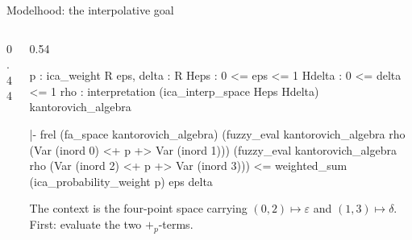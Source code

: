 \documentclass[10pt,aspectratio=169]{beamer}
\newcommand{\eps}{\varepsilon}
\newcommand{\bpl}[1]{+_{#1}}
\begin{document}
            \begin{frame}[fragile]{Modelhood: the interpolative goal}
                \begin{columns}[T]
                    \begin{column}{0.44\textwidth}
                    \end{column}
                    \begin{column}{0.54\textwidth}
                        \begin{goalbox}[title={Goal 4 / 4 \quad (ICA\_Interp),
                            as it arrives}]
                            \begin{gctx}
p : ica_weight R
eps, delta : R
Heps : 0 <= eps <= 1
Hdelta : 0 <= delta <= 1
rho : interpretation (ica_interp_space Heps Hdelta)
        kantorovich_algebra
                            \end{gctx}
                            \tcblower
                            \begin{gconc}
|- frel (fa_space kantorovich_algebra)
     (fuzzy_eval kantorovich_algebra rho
        (Var (inord 0) <+ p +> Var (inord 1)))
     (fuzzy_eval kantorovich_algebra rho
        (Var (inord 2) <+ p +> Var (inord 3)))
   <= weighted_sum (ica_probability_weight p) eps delta
                            \end{gconc}
                        \end{goalbox}
                        {\footnotesize The context is the four-point
                            space carrying $(0,2) \mapsto \eps$ and
                            $(1,3) \mapsto \delta$. First: evaluate the
                        two $\bpl{p}$-terms.}
                    \end{column}
                \end{columns}
            \end{frame}
\end{document}
